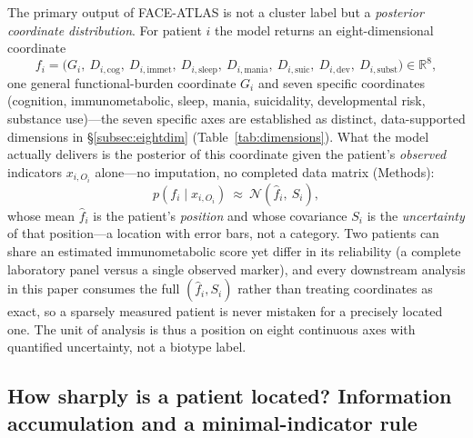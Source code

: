 The primary output of FACE-ATLAS is not a cluster label but a \emph{posterior coordinate
distribution}. For patient $i$ the model returns an eight-dimensional coordinate
\begin{equation}
  f_i=\bigl(G_i,\ D_{i,\mathrm{cog}},\ D_{i,\mathrm{immet}},\
  D_{i,\mathrm{sleep}},\ D_{i,\mathrm{mania}},\ D_{i,\mathrm{suic}},\
  D_{i,\mathrm{dev}},\ D_{i,\mathrm{subst}}\bigr)\in\mathbb{R}^{8},
  \label{eq:res-coord}
\end{equation}
one general functional-burden coordinate $G_i$ and seven specific coordinates
(cognition, immunometabolic, sleep, mania, suicidality, developmental risk,
substance use)---the seven specific axes are established as distinct, data-supported
dimensions in \S\ref{subsec:eightdim} (Table~\ref{tab:dimensions}). What the model
actually delivers is the posterior of this coordinate
given the patient's \emph{observed} indicators $x_{i,O_i}$ alone---no imputation, no
completed data matrix (Methods):
\begin{equation}
  p\!\left(f_i\mid x_{i,O_i}\right)\ \approx\ \mathcal{N}\!\left(\hat f_i,\ S_i\right),
  \label{eq:res-post}
\end{equation}
whose mean $\hat f_i$ is the patient's \emph{position} and whose covariance $S_i$ is the
\emph{uncertainty} of that position---a location with error bars, not a category. Two
patients can share an estimated immunometabolic score yet differ in its reliability (a
complete laboratory panel versus a single observed marker), and every downstream analysis
in this paper consumes the full $(\hat f_i,S_i)$ rather than treating coordinates as exact,
so a sparsely measured patient is never mistaken for a precisely located one. The unit of
analysis is thus a position on eight continuous axes with quantified uncertainty, not a
biotype label.

\subsection{How sharply is a patient located? Information accumulation and a minimal-indicator rule}
\label{subsec:localization}

